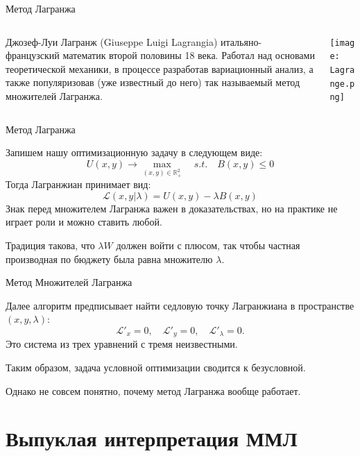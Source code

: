 \documentclass{beamer}
\begin{document}
\begin{frame}{Метод Лагранжа}

\begin{columns}
\begin{column}{0.5\textwidth}
   \alert{Джозеф-Луи Лагранж} (Giuseppe Luigi Lagrangia) итальяно-французский математик второй половины 18 века. Работал над основами теоретической механики, в процессе разработав вариационный анализ, а также популяризовав (уже известный до него) так называемый \alert{метод множителей Лагранжа}.
\end{column}
\begin{column}{0.5\textwidth}  %
    \begin{center}
     \texttt{[image: Lagrange.png]}
     \end{center}
\end{column}
\end{columns}

\end{frame}

\begin{frame}{Метод Лагранжа}

Запишем нашу оптимизационную задачу в следующем виде:
$$ U(x, y) \to \max_{(x,y) \in \mathbb{R}^2_{+}} \quad s.t.\quad  B(x,y) \leqslant 0$$
Тогда \alert{Лагранжиан} принимает вид:
$$ \mathcal{L}(x, y | \lambda) = U(x,y) - \lambda B(x,y)$$
Знак перед множителем Лагранжа важен в доказательствах, но на практике не играет роли и можно ставить любой.

Традиция такова, что $\lambda W$ должен войти с плюсом, так чтобы частная производная по бюджету была равна множителю $\lambda$.

\end{frame}

\begin{frame}{Метод Множителей Лагранжа}

Далее алгоритм предписывает найти седловую точку Лагранжиана в пространстве $(x, y, \lambda)$:
$$ \mathcal{L}'_x = 0, \quad \mathcal{L}'_y = 0, \quad \mathcal{L}'_{\lambda} = 0.$$
Это система из трех уравнений с тремя неизвестными.

Таким образом, задача условной оптимизации сводится к безусловной. 

Однако не совсем понятно, почему метод Лагранжа вообще работает.

\end{frame}

\section{Выпуклая интерпретация ММЛ}
\end{document}

